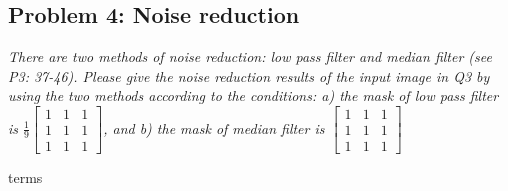 \documentclass[
        ]{beamer}
\begin{document}
    \subsection{Problem 4: Noise reduction}
        \begin{frame}[c]{\subsecname}
            \emph{There are two methods of noise reduction: low pass filter and median filter (see P3: 37-46). Please give the noise reduction results of the input image in Q3 by using the two methods according to the conditions: a) the mask of low pass filter is $ \frac{1}{9} \begin{bmatrix} 1 & 1 & 1\\ 1 & 1 & 1\\ 1 & 1 & 1 \end{bmatrix} $, and b) the mask of median filter is $ \begin{bmatrix} 1 & 1 & 1\\ 1 & 1 & 1\\ 1 & 1 & 1 \end{bmatrix} $ }
        \end{frame}
        
        \begin{frame}[c]{\subsecname terms}
            \begin{overprint}
            \end{overprint}   
        \end{frame}    
        
\end{document}
